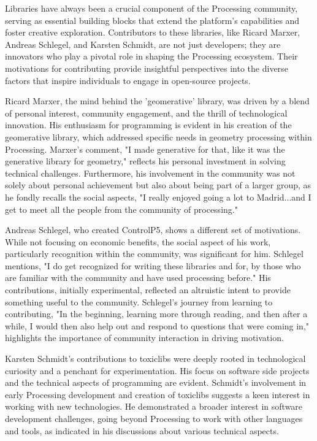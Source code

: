 Libraries have always been a crucial component of the Processing community, serving as essential building blocks that extend the platform's capabilities and foster creative exploration. Contributors to these libraries, like Ricard Marxer, Andreas Schlegel, and Karsten Schmidt, are not just developers; they are innovators who play a pivotal role in shaping the Processing ecosystem. Their motivations for contributing provide insightful perspectives into the diverse factors that inspire individuals to engage in open-source projects.

Ricard Marxer, the mind behind the 'geomerative' library, was driven by a blend of personal interest, community engagement, and the thrill of technological innovation. His enthusiasm for programming is evident in his creation of the geomerative library, which addressed specific needs in geometry processing within Processing. Marxer's comment, "I made generative for that, like it was the generative library for geometry," reflects his personal investment in solving technical challenges. Furthermore, his involvement in the community was not solely about personal achievement but also about being part of a larger group, as he fondly recalls the social aspects, "I really enjoyed going a lot to Madrid...and I get to meet all the people from the community of processing."

Andreas Schlegel, who created ControlP5, shows a different set of motivations. While not focusing on economic benefits, the social aspect of his work, particularly recognition within the community, was significant for him. Schlegel mentions, "I do get recognized for writing these libraries and for, by those who are familiar with the community and have used processing before." His contributions, initially experimental, reflected an altruistic intent to provide something useful to the community. Schlegel's journey from learning to contributing, "In the beginning, learning more through reading, and then after a while, I would then also help out and respond to questions that were coming in," highlights the importance of community interaction in driving motivation.

Karsten Schmidt's contributions to toxiclibs were deeply rooted in technological curiosity and a penchant for experimentation. His focus on software side projects and the technical aspects of programming are evident. Schmidt's involvement in early Processing development and creation of toxiclibs suggests a keen interest in working with new technologies. He demonstrated a broader interest in software development challenges, going beyond Processing to work with other languages and tools, as indicated in his discussions about various technical aspects.

